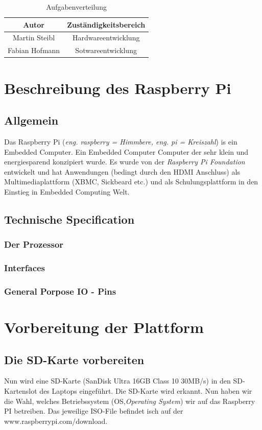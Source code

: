 \documentclass[12pt,a4paper]{article}
\begin{document}
\begin{table}[htp]
\centering
\begin{tabular}{|c|c|}
\hline 
Autor & Zuständigkeitsbereich \\ 
\hline 
\hline
Martin Steibl & Hardwareentwicklung \\ 
\hline 
Fabian Hofmann & Sotwareentwicklung \\ 
\hline 
\end{tabular}
\caption{Aufgabenverteilung} 
\end{table}

\section{Beschreibung des Raspberry Pi}
\subsection{Allgemein}
Das Raspberry Pi (\textit{eng. raspberry = Himmbere, eng. pi = Kreiszahl}) is ein Embedded Computer. Ein Embedded Computer Computer der sehr klein und energiesparend konzipiert wurde. Es wurde von der \textit{ Raspberry Pi Foundation} entwickelt und hat Anwendungen (bedingt durch den HDMI Anschluss) als Multimediaplattform (XBMC, Sickbeard etc.) und als Schulungsplattform in den Einstieg in Embedded Computing Welt.

\subsection{Technische Specification}
\subsubsection{Der Prozessor}

\subsubsection{Interfaces}

\subsubsection{General Porpose IO - Pins}

\section{Vorbereitung der Plattform}
\subsection{Die SD-Karte vorbereiten}
Nun wird eine SD-Karte (SanDisk Ultra 16GB Class 10 30MB/s) in den SD-Kartenslot des Laptops eingeführt. Die SD-Karte wird erkannt. Nun haben wir die Wahl, welches Betriebssystem (OS,\textit{Operating System}) wir auf das Raspberry PI betreiben. Das jeweilige ISO-File befindet isch auf der www.raspberrypi.com/download. 
\end{document}
